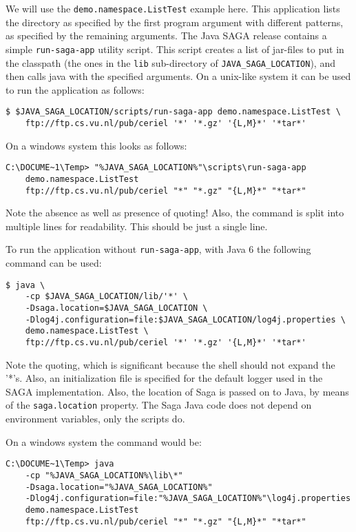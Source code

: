 \documentclass[a4paper,10pt]{article}
\begin{document}
We will use the \texttt{demo.namespace.ListTest} example here.
This application lists the directory as specified by the first
program argument with different patterns, as specified by the
remaining arguments.
The Java SAGA release contains a simple \texttt{run-saga-app} utility script.
This script creates a list of jar-files to put in the classpath (the
ones in the \texttt{lib} sub-directory of \texttt{JAVA\_SAGA\_LOCATION}),
and then calls java with the specified arguments.
On a unix-like system it can be used to run the application as follows:

\noindent
{\small
\begin{verbatim}
$ $JAVA_SAGA_LOCATION/scripts/run-saga-app demo.namespace.ListTest \
    ftp://ftp.cs.vu.nl/pub/ceriel '*' '*.gz' '{L,M}*' '*tar*'
\end{verbatim}
}
\noindent

On a windows system this looks as follows:

\noindent
{\small
\begin{verbatim}
C:\DOCUME~1\Temp> "%JAVA_SAGA_LOCATION%"\scripts\run-saga-app
    demo.namespace.ListTest
    ftp://ftp.cs.vu.nl/pub/ceriel "*" "*.gz" "{L,M}*" "*tar*"
\end{verbatim}
}
\noindent

Note the absence as well as presence of quoting! Also, the
command is split into multiple lines for readability.
This should be just a single line.

To run the application without \texttt{run-saga-app},
with Java 6 the following command can be used:

\noindent
{\small
\begin{verbatim}
$ java \
    -cp $JAVA_SAGA_LOCATION/lib/'*' \
    -Dsaga.location=$JAVA_SAGA_LOCATION \
    -Dlog4j.configuration=file:$JAVA_SAGA_LOCATION/log4j.properties \
    demo.namespace.ListTest \
    ftp://ftp.cs.vu.nl/pub/ceriel '*' '*.gz' '{L,M}*' '*tar*'
\end{verbatim}
}
\noindent

Note the quoting, which is significant because the shell should not expand
the '*'s. Also, an initialization file is specified for the default logger
used in the SAGA implementation.
Also, the location of Saga is passed on to Java, by means of the
\texttt{saga.location} property. The Saga Java code does not depend on
environment variables, only the scripts do.

On a windows system the command would be:

\noindent
{\small
\begin{verbatim}
C:\DOCUME~1\Temp> java
    -cp "%JAVA_SAGA_LOCATION%\lib\*"
    -Dsaga.location="%JAVA_SAGA_LOCATION%"
    -Dlog4j.configuration=file:"%JAVA_SAGA_LOCATION%"\log4j.properties
    demo.namespace.ListTest
    ftp://ftp.cs.vu.nl/pub/ceriel "*" "*.gz" "{L,M}*" "*tar*"
\end{verbatim}
}
\noindent
\end{document}
